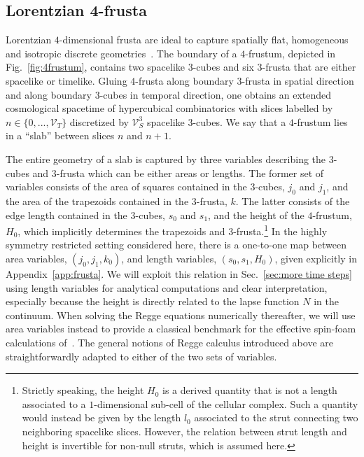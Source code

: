 \documentclass[amsmath,amssymb,aps,twocolumn,superscriptaddress,nofootinbib]{revtex4-1}
\begin{document}
\subsection{Lorentzian 4-frusta}\label{sec:Lorentzian frustum}

Lorentzian $4$-dimensional frusta are ideal to capture spatially flat, homogeneous and isotropic discrete geometries~\cite{Bahr:2017bn,Jercher:2023csk}.
The boundary of a $4$-frustum, depicted in Fig.~\ref{fig:4frustum}, contains two spacelike $3$-cubes and six $3$-frusta that are either spacelike or timelike.
Gluing $4$-frusta along boundary $3$-frusta in spatial direction and along boundary $3$-cubes in temporal direction, one obtains an extended cosmological spacetime of hypercubical combinatorics with slices labelled by $n\in\{0,...,\mathcal{V}_T\}$ discretized by $\mathcal{V}_S^3$ spacelike $3$-cubes.
We say that a $4$-frustum lies in a \enquote{slab} between slices $n$ and $n+1$.

The entire geometry of a slab is captured by three variables describing the $3$-cubes and $3$-frusta which can be either areas or lengths.
The former set of variables consists of the area of squares contained in the $3$-cubes, $j_0$ and $j_1$, and the area of the trapezoids contained in the $3$-frusta, $k$.
The latter consists of the edge length contained in the $3$-cubes, $s_0$ and $s_1$, and the height of the $4$-frustum, $H_0$, which implicitly determines the trapezoids and $3$-frusta.\footnote{Strictly speaking, the height $H_0$ is a derived quantity that is not a length associated to a $1$-dimensional sub-cell of the cellular complex. Such a quantity would instead be given by the length $l_0$ associated to the strut connecting two neighboring spacelike slices. However, the relation between strut length and height is invertible for non-null struts, which is assumed here.}
In the highly symmetry restricted setting considered here, there is a one-to-one map between area variables, $(j_0,j_1,k_0)$, and length variables, $(s_0,s_1,H_0)$, given explicitly in Appendix~\ref{app:frusta}.
We will exploit this relation in Sec.~\ref{sec:more time steps} using length variables for analytical computations and clear interpretation, especially because the height is directly related to the lapse function $N$ in the continuum.
When solving the Regge equations numerically thereafter, we will use area variables instead to provide a classical benchmark for the effective spin-foam calculations of~\cite{Jercher:2025def}.
The general notions of Regge calculus introduced above are straightforwardly adapted to either of the two sets of variables.
\end{document}
